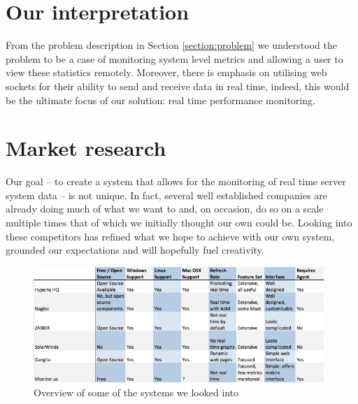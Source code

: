\documentclass{l3proj}
\begin{document}

\section{Our interpretation}


From the problem description in Section \ref{section:problem} we understood the problem to be a case of monitoring system level metrics and allowing a user to view these statistics remotely. Moreover, there is emphasis on utilising web sockets for their ability to send and receive data in real time, indeed, this would be the ultimate focus of our solution: real time performance monitoring.


\section{Market research}
\label{section:MarketResearch}


Our goal -- to create a system that allows for the monitoring of real time server system data -- is not unique. In fact, several well established companies are already doing much of what we want to and, on occasion, do so on a scale multiple times that of which we initially thought our own could be. Looking into these competitors has refined what we hope to achieve with our own system, grounded our expectations and will hopefully fuel creativity.

\begin{figure}[H]
\centering
\includegraphics[width=110mm]{Competitors/MarketSurveyTable}
\caption{Overview of some of the systems we looked into}
\label{fig:SurveyTable}
\end{figure}
\end{document}
